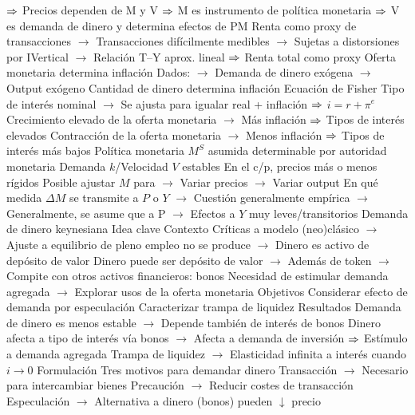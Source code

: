 \documentclass{nuevotema}
\begin{document}
\begin{esquemal}
				\4[] $\Rightarrow$ Precios dependen de M y V
				\4[] $\Rightarrow$ M es instrumento de política monetaria
				\4[] $\Rightarrow$ V es demanda de dinero y determina efectos de PM
				\4 Renta como proxy de transacciones
				\4[] $\to$ Transacciones difícilmente medibles
				\4[] $\to$ Sujetas a distorsiones por IVertical
				\4[] $\to$ Relación T--Y aprox. lineal
				\4[] $\Rightarrow$ Renta total como proxy
				\4 Oferta monetaria determina inflación
				\4[] Dados:
				\4[] $\to$ Demanda de dinero exógena
				\4[] $\to$ Output exógeno
				\4[] Cantidad de dinero determina inflación
				\4 Ecuación de Fisher
				\4[] Tipo de interés nominal
				\4[] $\to$ Se ajusta para igualar real + inflación
				\4[] $\Rightarrow$ $i = r + \pi^e$
				\4[] Crecimiento elevado de la oferta monetaria
				\4[] $\to$ Más inflación
				\4[] $\Rightarrow$ Tipos de interés elevados
				\4[] Contracción de la oferta monetaria
				\4[] $\to$ Menos inflación
				\4[] $\Rightarrow$ Tipos de interés más bajos
				\4 Política monetaria
				\4[] $M^S$ asumida determinable por autoridad monetaria
				\4[] Demanda $k$/Velocidad $V$ estables
				\4[] En el c/p, precios más o menos rígidos
				\4[] Posible ajustar $M$ para
				\4[] $\to$ Variar precios
				\4[] $\to$ Variar output
				\4[] En qué medida $\Delta M$ se transmite a $P$ o $Y$
				\4[] $\to$ Cuestión generalmente empírica
				\4[] $\to$ Generalmente, se asume que a P
				\4[] $\to$ Efectos a $Y$ muy leves/transitorios
		\2 Demanda de dinero keynesiana
			\3 Idea clave
				\4 Contexto
				\4[] Críticas a modelo (neo)clásico
				\4[] $\to$ Ajuste a equilibrio de pleno empleo no se produce
				\4[] $\to$ Dinero es activo de depósito de valor
				\4[] Dinero puede ser depósito de valor
				\4[] $\to$ Además de token
				\4[] $\to$ Compite con otros activos financieros: bonos
				\4[] Necesidad de estimular demanda agregada
				\4[] $\to$ Explorar usos de la oferta monetaria
				\4 Objetivos
				\4[] Considerar efecto de demanda por especulación
				\4[] Caracterizar trampa de liquidez
				\4 Resultados
				\4[] Demanda de dinero es menos estable
				\4[] $\to$ Depende también de interés de bonos
				\4[] Dinero afecta a tipo de interés vía bonos
				\4[] $\to$ Afecta a demanda de inversión
				\4[] $\Rightarrow$ Estímulo a demanda agregada
				\4[] Trampa de liquidez
				\4[] $\to$ Elasticidad infinita a interés cuando $i \to 0$
			\3 Formulación
				\4 Tres motivos para demandar dinero
				\4[i.] Transacción
				\4[] $\to$ Necesario para intercambiar bienes
				\4[ii.] Precaución
				\4[] $\to$ Reducir costes de transacción
				\4[iii.] Especulación
				\4[] $\to$ Alternativa a dinero (bonos) pueden $\downarrow$ precio

\end{esquemal}
\end{document}
